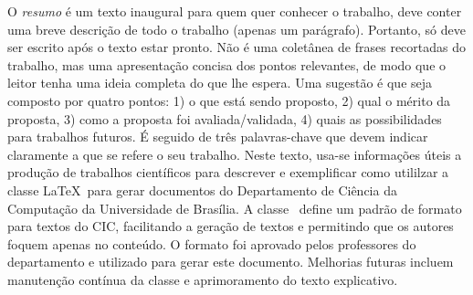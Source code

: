 O \emph{resumo} é um texto inaugural para quem quer conhecer o trabalho, deve conter 
uma breve descrição de todo o trabalho (apenas um parágrafo). Portanto, só deve 
ser escrito após o texto estar pronto. Não é uma coletânea de frases recortadas 
do trabalho, mas uma apresentação concisa dos pontos relevantes, de modo que o
leitor tenha uma ideia completa do que lhe espera. Uma sugestão é que seja composto
por quatro pontos: 1) o que está sendo proposto, 2) qual o mérito da proposta, 3)
como a proposta foi avaliada/validada, 4) quais as possibilidades para trabalhos
futuros. É seguido de três palavras-chave que devem indicar claramente a que se 
refere o seu trabalho. Neste texto, usa-se informações úteis a produção de trabalhos 
científicos para descrever e exemplificar como utililzar a classe \LaTeX\ para 
gerar documentos do Departamento de Ciência da Computação da Universidade de Brasília.
A classe \unbcic\ define um padrão de formato para textos do CIC, facilitando a
geração de textos e permitindo que os autores foquem apenas no conteúdo. O formato
foi aprovado pelos professores do departamento e utilizado para gerar este documento.
Melhorias futuras incluem manutenção contínua da classe e aprimoramento do texto
explicativo.